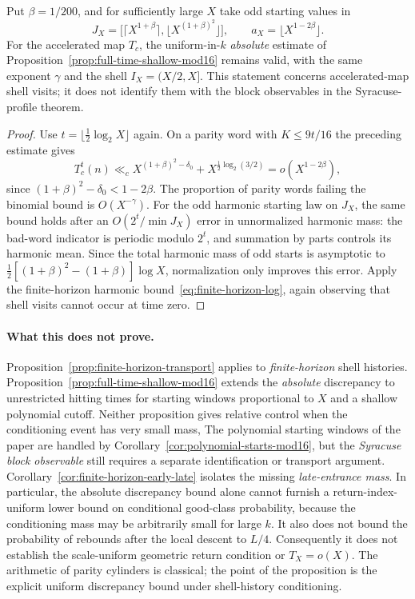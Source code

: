 \begin{corollary}
\label{cor:polynomial-starts-mod16}
Put $\beta=1/200$, and for sufficiently large $X$ take odd starting
values in
\[
 J_X=\bigl[\lceil X^{1+\beta}\rceil,
             \lfloor X^{(1+\beta)^2}\rfloor\bigr],
 \qquad a_X=\lfloor X^{1-2\beta}\rfloor.
\]
For the accelerated map $T_c$, the uniform-in-$k$ \emph{absolute}
estimate of Proposition~\ref{prop:full-time-shallow-mod16} remains valid,
with the same exponent $\gamma$ and the shell $I_X=(X/2,X]$.
This statement concerns accelerated-map shell visits; it does not
identify them with the block observables in the Syracuse-profile theorem.
\end{corollary}
\begin{proof}
Use $t=\lfloor\frac12\log_2X\rfloor$ again. On a parity word
with $K\le9t/16$ the preceding estimate gives
\[
 T_c^t(n)\ll_c X^{(1+\beta)^2-\delta_0}
              +X^{\frac12\log_2(3/2)}
              =o(X^{1-2\beta}),
\]
since $(1+\beta)^2-\delta_0<1-2\beta$.
The proportion of parity words failing the binomial bound is
$O(X^{-\gamma})$. For the odd harmonic starting law on $J_X$,
the same bound holds after an $O(2^t/\min J_X)$ error in
unnormalized harmonic mass: the bad-word indicator is periodic
modulo $2^t$, and summation by parts controls its harmonic
mean. Since the total harmonic mass of odd starts is asymptotic
to $\tfrac12[(1+\beta)^2-(1+\beta)]\log X$, normalization
only improves this error. Apply the finite-horizon harmonic
bound~\eqref{eq:finite-horizon-log}, again observing that
shell visits cannot occur at time zero.
\end{proof}

\paragraph{What this does not prove.}
Proposition~\ref{prop:finite-horizon-transport} applies to \emph{finite-horizon}
shell histories. Proposition~\ref{prop:full-time-shallow-mod16}
extends the \emph{absolute} discrepancy to unrestricted hitting times
for starting windows proportional to $X$ and a shallow polynomial
cutoff. Neither proposition gives relative control
when the conditioning event has very small mass, The polynomial starting windows of the paper are handled by
Corollary~\ref{cor:polynomial-starts-mod16}, but the
\emph{Syracuse block observable} still requires a separate
identification or transport argument.
Corollary~\ref{cor:finite-horizon-early-late} isolates the missing
\emph{late-entrance mass}. In particular, the absolute discrepancy
bound alone cannot furnish a return-index-uniform lower bound on
conditional good-class probability, because the conditioning mass
may be arbitrarily small for large $k$.
It also does not bound the probability of rebounds after the
local descent to $L/4$. Consequently it does not establish the
scale-uniform geometric return condition or $T_X=o(X)$.
The arithmetic of parity cylinders is classical; the point of
the proposition is the explicit uniform discrepancy bound under
shell-history conditioning.
